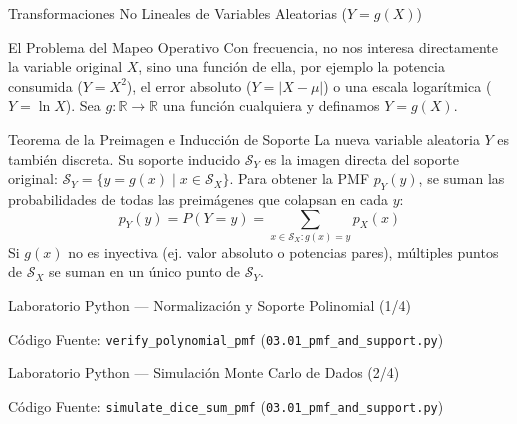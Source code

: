\documentclass[10pt, aspectratio=169]{beamer}
\begin{document}
\begin{frame}{Transformaciones No Lineales de Variables Aleatorias ($Y=g(X)$)}
  \fontsize{7.5pt}{9pt}\selectfont
  \begin{block}{El Problema del Mapeo Operativo}
    \fontsize{7.5pt}{9pt}\selectfont
    Con frecuencia, no nos interesa directamente la variable original $X$, sino una función de ella, por ejemplo la potencia consumida ($Y = X^2$), el error absoluto ($Y = |X - \mu|$) o una escala logarítmica ($Y = \ln X$). Sea $g: \mathbb{R} \to \mathbb{R}$ una función cualquiera y definamos $Y = g(X)$.
  \end{block}
  \vspace{-0.15cm}
  \pause
  \begin{alertblock}{Teorema de la Preimagen e Inducción de Soporte}
    \fontsize{7.5pt}{9pt}\selectfont
    La nueva variable aleatoria $Y$ es también discreta. Su soporte inducido $\mathcal{S}_Y$ es la imagen directa del soporte original: $\mathcal{S}_Y = \{y = g(x) \mid x \in \mathcal{S}_X\}$. Para obtener la PMF $p_Y(y)$, se suman las probabilidades de todas las preimágenes que colapsan en cada $y$:
    $$p_Y(y) = P(Y = y) = \sum_{x \in \mathcal{S}_X: g(x) = y} p_X(x)$$
    Si $g(x)$ no es inyectiva (ej. valor absoluto o potencias pares), múltiples puntos de $\mathcal{S}_X$ se suman en un único punto de $\mathcal{S}_Y$.
  \end{alertblock}
\end{frame}

\begin{frame}[fragile]{Laboratorio Python — Normalización y Soporte Polinomial (1/4)}
  \begin{block}{Código Fuente: \texttt{verify\_polynomial\_pmf} (\texttt{03.01\_pmf\_and\_support.py})}
    \fontsize{6pt}{7pt}\selectfont
    
  \end{block}
\end{frame}

\begin{frame}[fragile]{Laboratorio Python — Simulación Monte Carlo de Dados (2/4)}
  \begin{block}{Código Fuente: \texttt{simulate\_dice\_sum\_pmf} (\texttt{03.01\_pmf\_and\_support.py})}
    \fontsize{6pt}{7pt}\selectfont
    
  \end{block}
\end{frame}
\end{document}
